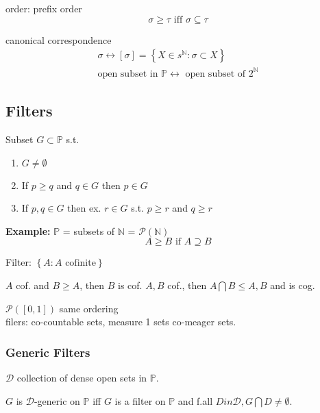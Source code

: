 \documentclass[12pt]{article}
\newcommand{\Nat}{\ensuremath{\mathbb{N}}}
\newcommand{\Pow}[1]{\ensuremath{\mathcal{P}(#1)}}
\begin{document}
order: prefix order
\[
 \sigma \ge \tau \text{ iff } \sigma \subseteq \tau
\]

canonical correspondence
\begin{align*}
  \sigma \leftrightarrow [\sigma] = \left\{X \in s^{\Nat} : \sigma \subset X \right\} \\
  \text{open subset in } \mathbb{P} \leftrightarrow \text{ open subset of } 2^{\Nat}
\end{align*}

\subsection*{Filters}
Subset $G \subset \mathbb{P}$ s.t.
\begin{enumerate}
  \item $G \ne \emptyset$
  \item If $p \ge q$ and $q \in G$ then $p \in G$
  \item If $p,q \in G$ then ex. $r \in G$ s.t. $p \ge r$ and $q \ge r$ 
\end{enumerate}

\textbf{Example:}
$\mathbb{P}$ = subsets of $\Nat$ = $\Pow{\Nat}$
\[
        A \ge B \text{ if } A \supseteq B
\]

Filter: $\left\{A : A \text{ cofinite} \right\}$

$A$ cof. and $B \ge A$, then $B$ is cof.
$A,B$ cof., then $A \bigcap B \le A,B$ and is cog.


$\Pow{[0,1]}$ same ordering \\
filers: co-countable sets,
measure 1 sets
co-meager sets.

\subsubsection*{Generic Filters}
$\mathcal{D}$ collection of dense open sets in $\mathbb{P}$.

$G$ is $\mathcal{D}$-generic on $\mathbb{P}$ iff 
$G$ is a filter on $\mathbb{P}$ and f.all $D in \mathcal{D}, G \bigcap D \ne \emptyset$. 
\end{document}
